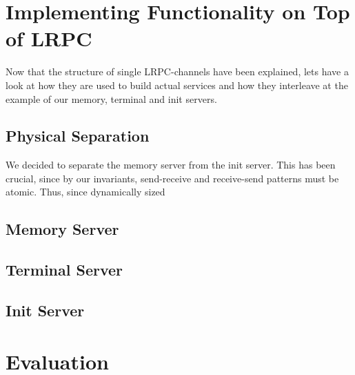 \section{Implementing Functionality on Top of LRPC}
Now that the structure of single LRPC-channels have been explained, 
lets have a look at how they are used to build actual services and how 
they interleave at the example of our memory, terminal and init servers.

\subsection{Physical Separation}
We decided to separate the memory server from the init server.
This has been crucial, since by our invariants, send-receive and receive-send 
patterns must be atomic. Thus, since dynamically sized 

\subsection{Memory Server}
\subsection{Terminal Server}
\subsection{Init Server}

\section{Evaluation} %


